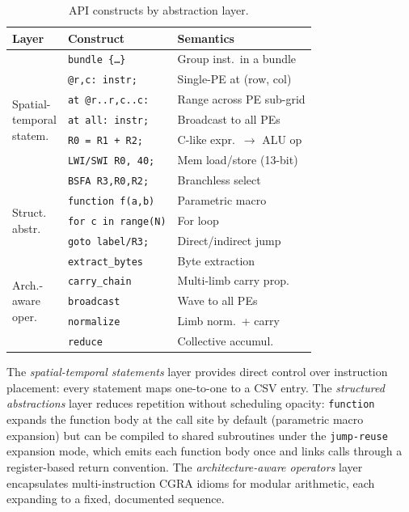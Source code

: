 \begin{table}[hbt]
\caption{\castm{} API constructs by abstraction layer.}
\label{tab:openedge-constructs}
\centering
\scriptsize
\setlength{\tabcolsep}{2pt}
\begin{tabular}{@{}llp{3.2cm}@{}}
\toprule
\textbf{Layer} & \textbf{Construct} & \textbf{Semantics} \\
\midrule
\multirow{7}{*}{\parbox{1.2cm}{Spatial-\\temporal\\statem.}}
 & \texttt{bundle \{\ldots\}} & Group inst.\ in a bundle \\
 & \texttt{@r,c: instr;} & Single-PE at (row, col) \\
 & \texttt{at @r..r,c..c:} & Range across PE sub-grid \\
 & \texttt{at all: instr;} & Broadcast to all PEs \\
 & \texttt{R0 = R1 + R2;} & C-like expr.\ $\to$ ALU op \\
 & \texttt{LWI/SWI R0, 40;} & Mem load/store (13-bit) \\
 & \texttt{BSFA R3,R0,R2;} & Branchless select \\
\midrule
\multirow{3}{*}{\parbox{1.2cm}{Struct.\\abstr.}}
 & \texttt{function f(a,b)} & Parametric macro \\
 & \texttt{for c in range(N)} & For loop \\
 & \texttt{goto label/R3;} & Direct/indirect jump \\
\midrule
\multirow{5}{*}{\parbox{1.2cm}{Arch.-\\aware\\oper.}}
 & \texttt{extract\_bytes} & Byte extraction \\
 & \texttt{carry\_chain} & Multi-limb carry prop. \\
 & \texttt{broadcast} & Wave to all PEs \\
 & \texttt{normalize} & Limb norm.\ + carry \\
 & \texttt{reduce} & Collective accumul. \\
\bottomrule
\end{tabular}
\end{table}

The \emph{spatial-temporal statements} layer provides direct control over instruction placement: every statement maps one-to-one to a CSV entry.
The \emph{structured abstractions} layer reduces repetition without scheduling opacity: \texttt{function} expands the function body at the call site by default (parametric macro expansion)  but can be compiled to shared subroutines under the \texttt{jump-reuse}  expansion mode, which emits each function body once and links calls through a register-based return convention.
The \emph{architecture-aware operators} layer encapsulates multi-instruction CGRA idioms for modular arithmetic, each expanding to a fixed, documented sequence.

